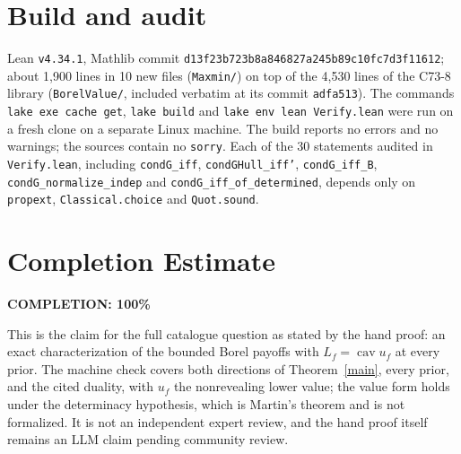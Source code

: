 \documentclass[11pt]{article}
\theoremstyle{definition}
\begin{document}
\section{Build and audit}

Lean \texttt{v4.34.1}, Mathlib commit \texttt{d13f23b723b8a846827a245b89c10fc7d3f11612}; about 1,900 lines in 10 new files (\texttt{Maxmin/}) on top of the 4,530 lines of the C73-8 library (\texttt{BorelValue/}, included verbatim at its commit \texttt{adfa513}). The commands \texttt{lake exe cache get}, \texttt{lake build} and \texttt{lake env lean Verify.lean} were run on a fresh clone on a separate Linux machine. The build reports no errors and no warnings; the sources contain no \texttt{sorry}. Each of the 30 statements audited in \texttt{Verify.lean}, including \texttt{condG\_iff}, \texttt{condGHull\_iff'}, \texttt{condG\_iff\_B}, \texttt{condG\_normalize\_indep} and \texttt{condG\_iff\_of\_determined}, depends only on \texttt{propext}, \texttt{Classical.choice} and \texttt{Quot.sound}.

\section{Completion Estimate}
\noindent\textbf{COMPLETION: 100\%}

This is the claim for the full catalogue question as stated by the hand proof: an exact characterization of the bounded Borel payoffs with $L_f=\operatorname{cav}u_f$ at every prior. The machine check covers both directions of Theorem~\ref{main}, every prior, and the cited duality, with $u_f$ the nonrevealing lower value; the value form holds under the determinacy hypothesis, which is Martin's theorem and is not formalized. It is not an independent expert review, and the hand proof itself remains an LLM claim pending community review.
\end{document}
